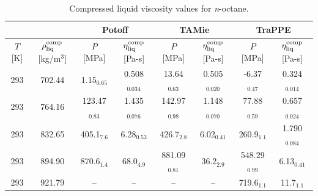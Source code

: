 \documentclass[preprint,review,12pt]{elsarticle}
\begin{document}
	\begin{table}[H]
		\caption{Compressed liquid viscosity values for \textit{n}-octane.}
		\begin{center}
			\begin{tabular}{|c|c|c|c|c|c|c|c|}
				\hline
				&                  & \multicolumn{2}{c|}{Potoff}     & \multicolumn{2}{c|}{TAMie}      & \multicolumn{2}{c|}{TraPPE}    \\ \hline
				$T$ {[}K{]} & $\rho^{\rm comp}_{\rm liq}$ {[}kg/m$^3${]} & $P$ {[}MPa{]}    & $\eta^{\rm comp}_{\rm liq}$ {[}Pa-s{]} & $P$ {[}MPa{]}    & $\eta^{\rm comp}_{\rm liq}$ {[}Pa-s{]} & $P$ {[}MPa{]}   & $\eta^{\rm comp}_{\rm liq}$ {[}Pa-s{]} \\ \hline
				293 & 702.44 & 1.15$_{0.65}$   & 0.508$_{0.034}$ & 13.64$_{0.63}$  & 0.505$_{0.020}$ & -6.37$_{0.47}$  & 0.324$_{0.014}$ \\ \hline
				293 & 764.16 & 123.47$_{0.83}$ & 1.435$_{0.076}$ & 142.97$_{0.98}$ & 1.148$_{0.070}$ & 77.88$_{0.59}$  & 0.657$_{0.024}$ \\ \hline
				293 & 832.65 & 405.1$_{7.6}$   & 6.28$_{0.53}$   & 426.7$_{2.8}$   & 6.02$_{0.41}$   & 260.9$_{1.1}$   & 1.790$_{0.084}$ \\ \hline
				293 & 894.90 & 870.6$_{1.4}$   & 68.0$_{4.9}$    & 881.09$_{0.81}$ & 36.2$_{2.9}$    & 548.29$_{0.99}$ & 6.13$_{0.41}$   \\ \hline
				293 & 921.79 & --               & --               & --               & --               & 719.6$_{1.1}$   & 11.7$_{1.1}$    \\ \hline
			\end{tabular}
		\end{center}
	\end{table}
\end{document}
